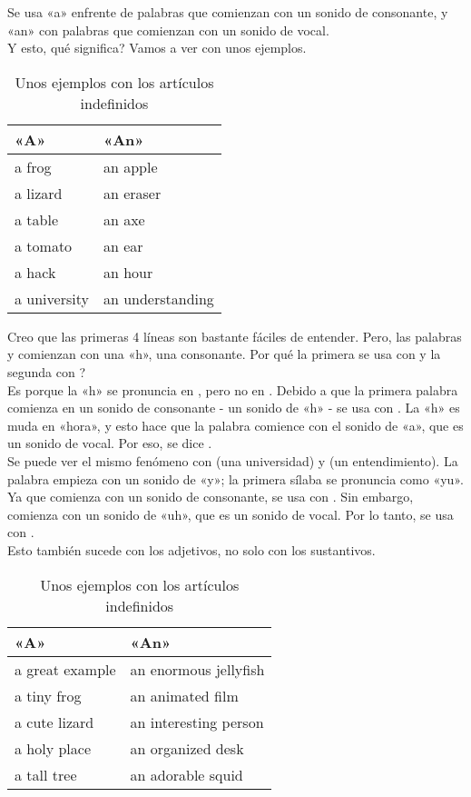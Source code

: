 Se usa «a» enfrente de palabras que comienzan con un sonido de consonante,
y «an» con palabras que comienzan con un sonido de vocal.\\

Y esto, \textquestiondown qu\'e significa? Vamos a ver con unos ejemplos.

\begin{table}[H]
	\centering
	\begin{tabular}{ll}
	\toprule
	\textbf{«A»} & \textbf{«An»} \\
	\midrule
	a frog & an apple \\
	a lizard & an eraser \\
	a table & an axe \\
	a tomato & an ear \\
	a hack & an hour \\
	a university & an understanding \\
	\bottomrule
	\end{tabular}
	\caption{Unos ejemplos con los art\'iculos indefinidos}
\end{table}

Creo que las primeras 4 l\'ineas son bastante f\'aciles de entender.
Pero, las palabras  y  comienzan con una «h», una
consonante. \textquestiondown Por qu\'e la primera se usa con 
y la segunda con ? \\

Es porque la «h» se pronuncia en , pero no en .
Debido a que la primera palabra comienza en un sonido de consonante - un
sonido de «h» - se usa con . La «h» es muda en «hora», y esto
hace que la palabra comience con el sonido de «a», que es un sonido de vocal.
Por eso, se dice .\\

Se puede ver el mismo fen\'omeno con  (una universidad) y
 (un entendimiento). La palabra  empieza
con un sonido de «y»; la primera s\'ilaba se pronuncia como «yu». Ya que
comienza con un sonido de consonante, se usa con . Sin embargo,
 comienza con un sonido de «uh», que es un sonido de vocal.
Por lo tanto, se usa con .\\

Esto tambi\'en sucede con los adjetivos, no solo con los sustantivos.

\begin{table}[H]
	\centering
	\begin{tabular}{ll}
	\toprule
	\textbf{«A»} & \textbf{«An»} \\
	\midrule
	a great example & an enormous jellyfish \\
	a tiny frog & an animated film \\
	a cute lizard & an interesting person \\
	a holy place & an organized desk\\
	a tall tree & an adorable squid \\
	\bottomrule
	\end{tabular}
	\caption{Unos ejemplos con los art\'iculos indefinidos}
\end{table}

